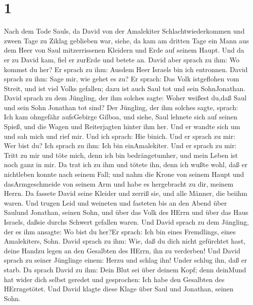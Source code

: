 \hypertarget{section}{%
\section{1}\label{section}}

 Nach dem Tode Sauls, da David von der Amalekiter
Schlachtwiederkommen und zween Tage zu Ziklag geblieben war,
 siehe, da kam am dritten Tage ein Mann aus dem Heer von
Saul mitzerrissenen Kleidern und Erde auf seinem Haupt. Und da er zu
David kam, fiel er zurErde und betete an.  David aber sprach
zu ihm: Wo kommst du her? Er sprach zu ihm: Ausdem Heer Israels bin ich
entronnen.  David sprach zu ihm: Sage mir, wie gehet es zu?
Er sprach: Das Volk istgeflohen vom Streit, und ist viel Volks gefallen;
dazu ist auch Saul tot und sein SohnJonathan.  David sprach
zu dem Jüngling, der ihm solches sagte: Woher weißest du,daß Saul und
sein Sohn Jonathan tot sind?  Der Jüngling, der ihm solches
sagte, sprach: Ich kam ohngefähr aufsGebirge Gilboa, und siehe, Saul
lehnete sich auf seinen Spieß, und die Wagen und Reiterjagten hinter ihm
her.  Und er wandte sich um und sah mich und rief mir. Und
ich sprach: Hie binich.  Und er sprach zu mir: Wer bist du?
Ich sprach zu ihm: Ich bin einAmalekiter.  Und er sprach zu
mir: Tritt zu mir und töte mich, denn ich bin bedrängetumher, und mein
Leben ist noch ganz in mir.  Da trat ich zu ihm und tötete
ihn, denn ich wußte wohl, daß er nichtleben konnte nach seinem Fall; und
nahm die Krone von seinem Haupt und dasArmgeschmeide von seinem Arm und
habe es hergebracht zu dir, meinem Herrn.  Da fassete David
seine Kleider und zerriß sie, und alle Männer, die beiihm waren.
 Und trugen Leid und weineten und fasteten bis an den Abend
über Saulund Jonathan, seinen Sohn, und über das Volk des HErrn und über
das Haus Israels, daßsie durchs Schwert gefallen waren. 
Und David sprach zu dem Jüngling, der es ihm ansagte: Wo bist du her?Er
sprach: Ich bin eines Fremdlings, eines Amalekiters, Sohn. 
David sprach zu ihm: Wie, daß du dich nicht gefürchtet hast, deine
Handzu legen an den Gesalbten des HErrn, ihn zu verderben! 
Und David sprach zu seiner Jünglinge einem: Herzu und schlag ihn! Under
schlug ihn, daß er starb.  Da sprach David zu ihm: Dein
Blut sei über deinem Kopf; denn deinMund hat wider dich selbst geredet
und gesprochen: Ich habe den Gesalbten des HErrngetötet. 
Und David klagte diese Klage über Saul und Jonathan, seinen Sohn.
